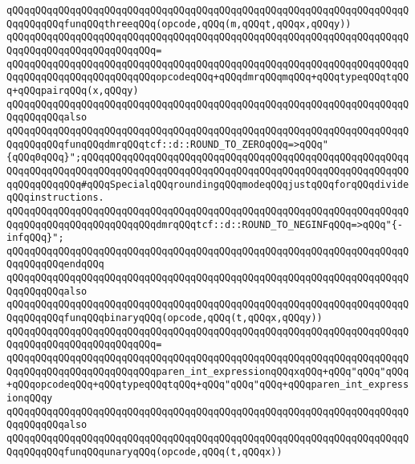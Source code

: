\verb|qQQqqQQqqQQqqQQqqQQqqQQqqQQqqQQqqQQqqQQqqQQqqQQqqQQqqQQqqQQqqQQqqQQqqQQqqQQqqQQqfunqQQqthreeqQQq(opcode,qQQq(m,qQQqt,qQQqx,qQQqy))|\newline
\verb|qQQqqQQqqQQqqQQqqQQqqQQqqQQqqQQqqQQqqQQqqQQqqQQqqQQqqQQqqQQqqQQqqQQqqQQqqQQqqQQqqQQqqQQqqQQqqQQq=|\newline
\verb|qQQqqQQqqQQqqQQqqQQqqQQqqQQqqQQqqQQqqQQqqQQqqQQqqQQqqQQqqQQqqQQqqQQqqQQqqQQqqQQqqQQqqQQqqQQqqQQqopcodeqQQq+qQQqdmrqQQqmqQQq+qQQqtypeqQQqtqQQq+qQQqpairqQQq(x,qQQqy)|\newline
\newline
\verb|qQQqqQQqqQQqqQQqqQQqqQQqqQQqqQQqqQQqqQQqqQQqqQQqqQQqqQQqqQQqqQQqqQQqqQQqqQQqqQQqalso|\newline
\verb|qQQqqQQqqQQqqQQqqQQqqQQqqQQqqQQqqQQqqQQqqQQqqQQqqQQqqQQqqQQqqQQqqQQqqQQqqQQqqQQqfunqQQqdmrqQQqtcf::d::ROUND_TO_ZEROqQQq=>qQQq"{qQQq0qQQq}";qQQqqQQqqQQqqQQqqQQqqQQqqQQqqQQqqQQqqQQqqQQqqQQqqQQqqQQqqQQqqQQqqQQqqQQqqQQqqQQqqQQqqQQqqQQqqQQqqQQqqQQqqQQqqQQqqQQqqQQqqQQqqQQqqQQqqQQqqQQq#qQQqSpecialqQQqroundingqQQqmodeqQQqjustqQQqforqQQqdivideqQQqinstructions.|\newline
\verb|qQQqqQQqqQQqqQQqqQQqqQQqqQQqqQQqqQQqqQQqqQQqqQQqqQQqqQQqqQQqqQQqqQQqqQQqqQQqqQQqqQQqqQQqqQQqqQQqdmrqQQqtcf::d::ROUND_TO_NEGINFqQQq=>qQQq"{-infqQQq}";|\newline
\verb|qQQqqQQqqQQqqQQqqQQqqQQqqQQqqQQqqQQqqQQqqQQqqQQqqQQqqQQqqQQqqQQqqQQqqQQqqQQqqQQqendqQQq|\newline
\newline
\verb|qQQqqQQqqQQqqQQqqQQqqQQqqQQqqQQqqQQqqQQqqQQqqQQqqQQqqQQqqQQqqQQqqQQqqQQqqQQqqQQqalso|\newline
\verb|qQQqqQQqqQQqqQQqqQQqqQQqqQQqqQQqqQQqqQQqqQQqqQQqqQQqqQQqqQQqqQQqqQQqqQQqqQQqqQQqfunqQQqbinaryqQQq(opcode,qQQq(t,qQQqx,qQQqy))|\newline
\verb|qQQqqQQqqQQqqQQqqQQqqQQqqQQqqQQqqQQqqQQqqQQqqQQqqQQqqQQqqQQqqQQqqQQqqQQqqQQqqQQqqQQqqQQqqQQqqQQq=|\newline
\verb|qQQqqQQqqQQqqQQqqQQqqQQqqQQqqQQqqQQqqQQqqQQqqQQqqQQqqQQqqQQqqQQqqQQqqQQqqQQqqQQqqQQqqQQqqQQqqQQqparen_int_expressionqQQqxqQQq+qQQq"qQQq"qQQq+qQQqopcodeqQQq+qQQqtypeqQQqtqQQq+qQQq"qQQq"qQQq+qQQqparen_int_expressionqQQqy|\newline
\newline
\verb|qQQqqQQqqQQqqQQqqQQqqQQqqQQqqQQqqQQqqQQqqQQqqQQqqQQqqQQqqQQqqQQqqQQqqQQqqQQqqQQqalso|\newline
\verb|qQQqqQQqqQQqqQQqqQQqqQQqqQQqqQQqqQQqqQQqqQQqqQQqqQQqqQQqqQQqqQQqqQQqqQQqqQQqqQQqfunqQQqunaryqQQq(opcode,qQQq(t,qQQqx))|\newline
